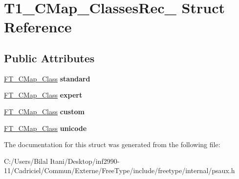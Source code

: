 \hypertarget{struct_t1___c_map___classes_rec__}{}\section{T1\+\_\+\+C\+Map\+\_\+\+Classes\+Rec\+\_\+ Struct Reference}
\label{struct_t1___c_map___classes_rec__}
\subsection*{Public Attributes}
\begin{DoxyCompactItemize}
\item 
\hyperlink{struct_f_t___c_map___class_rec__}{F\+T\+\_\+\+C\+Map\+\_\+\+Class} {\bfseries standard}\hypertarget{struct_t1___c_map___classes_rec___a11bc9e986af1c0cf91bd67e2e30028ca}{}\label{struct_t1___c_map___classes_rec___a11bc9e986af1c0cf91bd67e2e30028ca}

\item 
\hyperlink{struct_f_t___c_map___class_rec__}{F\+T\+\_\+\+C\+Map\+\_\+\+Class} {\bfseries expert}\hypertarget{struct_t1___c_map___classes_rec___a9576c404d5197dd66498725eacde1302}{}\label{struct_t1___c_map___classes_rec___a9576c404d5197dd66498725eacde1302}

\item 
\hyperlink{struct_f_t___c_map___class_rec__}{F\+T\+\_\+\+C\+Map\+\_\+\+Class} {\bfseries custom}\hypertarget{struct_t1___c_map___classes_rec___a21378ef457d58cc00f357011f45fba5e}{}\label{struct_t1___c_map___classes_rec___a21378ef457d58cc00f357011f45fba5e}

\item 
\hyperlink{struct_f_t___c_map___class_rec__}{F\+T\+\_\+\+C\+Map\+\_\+\+Class} {\bfseries unicode}\hypertarget{struct_t1___c_map___classes_rec___aab1eef66893dd7b0d25897612d056d4a}{}\label{struct_t1___c_map___classes_rec___aab1eef66893dd7b0d25897612d056d4a}

\end{DoxyCompactItemize}


The documentation for this struct was generated from the following file\+:\begin{DoxyCompactItemize}
\item 
C\+:/\+Users/\+Bilal Itani/\+Desktop/inf2990-\/11/\+Cadriciel/\+Commun/\+Externe/\+Free\+Type/include/freetype/internal/psaux.\+h\end{DoxyCompactItemize}
